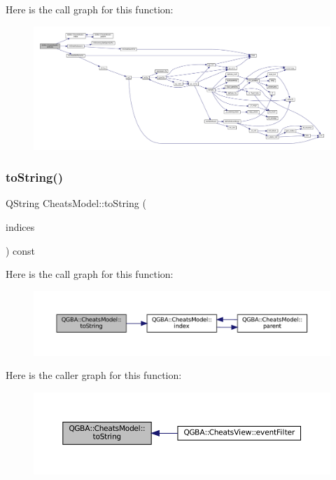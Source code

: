 Here is the call graph for this function\+:
\nopagebreak
\begin{figure}[H]
\begin{center}
\leavevmode
\includegraphics[width=350pt]{class_q_g_b_a_1_1_cheats_model_ad74f11015ce75f58c3b89fd12811d6aa_cgraph}
\end{center}
\end{figure}
\mbox{\label{class_q_g_b_a_1_1_cheats_model_aa5ed02b531e391355f9dec37a2f56f96}} 
\subsubsection{\texorpdfstring{to\+String()}{toString()}}
{\footnotesize\ttfamily Q\+String Cheats\+Model\+::to\+String (\begin{DoxyParamCaption}\item[{const Q\+Model\+Index\+List \&}]{indices }\end{DoxyParamCaption}) const}

Here is the call graph for this function\+:
\nopagebreak
\begin{figure}[H]
\begin{center}
\leavevmode
\includegraphics[width=350pt]{class_q_g_b_a_1_1_cheats_model_aa5ed02b531e391355f9dec37a2f56f96_cgraph}
\end{center}
\end{figure}
Here is the caller graph for this function\+:
\nopagebreak
\begin{figure}[H]
\begin{center}
\leavevmode
\includegraphics[width=350pt]{class_q_g_b_a_1_1_cheats_model_aa5ed02b531e391355f9dec37a2f56f96_icgraph}
\end{center}
\end{figure}


